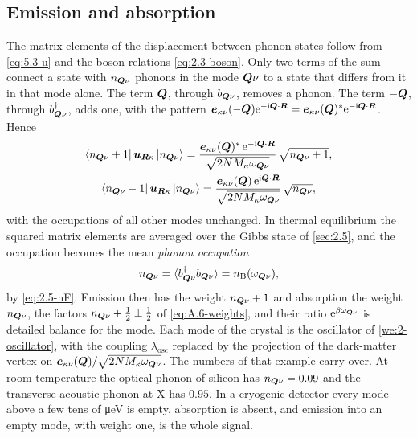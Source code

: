 \subsection{Emission and absorption}

The matrix elements of the displacement between phonon states follow from \cref{eq:5.3-u} and the boson relations \cref{eq:2.3-boson}. Only two terms of the sum connect a state with $n_{\bm{Q}\nu}$ phonons in the mode $\bm{Q}\nu$ to a state that differs from it in that mode alone. The term $\bm{Q}$, through $b_{\bm{Q}\nu}$, removes a phonon. The term $-\bm{Q}$, through $b^\dagger_{\bm{Q}\nu}$, adds one, with the pattern $\bm{e}_{\kappa\nu}(-\bm{Q})\mathrm{e}^{-\mathrm{i}\bm{Q}\cdot\bm{R}} = \bm{e}_{\kappa\nu}(\bm{Q})^*\mathrm{e}^{-\mathrm{i}\bm{Q}\cdot\bm{R}}$. Hence
\begin{equation}
  \begin{gathered}
  \langle n_{\bm{Q}\nu} + 1|\,\bm{u}_{\bm{R}\kappa}\,|n_{\bm{Q}\nu}\rangle = \frac{\bm{e}_{\kappa\nu}(\bm{Q})^*\,\mathrm{e}^{-\mathrm{i}\bm{Q}\cdot\bm{R}}}{\sqrt{2NM_\kappa\omega_{\bm{Q}\nu}}}\,\sqrt{n_{\bm{Q}\nu} + 1} ,
  \\
  \langle n_{\bm{Q}\nu} - 1|\,\bm{u}_{\bm{R}\kappa}\,|n_{\bm{Q}\nu}\rangle = \frac{\bm{e}_{\kappa\nu}(\bm{Q})\,\mathrm{e}^{\mathrm{i}\bm{Q}\cdot\bm{R}}}{\sqrt{2NM_\kappa\omega_{\bm{Q}\nu}}}\,\sqrt{n_{\bm{Q}\nu}} ,
  \end{gathered}
  \label{eq:5.3-me}
\end{equation}
with the occupations of all other modes unchanged. In thermal equilibrium the squared matrix elements are averaged over the Gibbs state of \cref{sec:2.5}, and the occupation becomes the mean \emph{phonon occupation}
\begin{equation*}
  n_{\bm{Q}\nu} = \langle b^\dagger_{\bm{Q}\nu}b_{\bm{Q}\nu}\rangle = n_{\mathrm{B}}(\omega_{\bm{Q}\nu}) ,
\end{equation*}
by \cref{eq:2.5-nF}. Emission then has the weight $n_{\bm{Q}\nu} + 1$ and absorption the weight $n_{\bm{Q}\nu}$, the factors $n_{\bm{Q}\nu} + \tfrac12 \pm \tfrac12$ of \cref{eq:A.6-weights}, and their ratio $\mathrm{e}^{\beta\omega_{\bm{Q}\nu}}$ is detailed balance for the mode. Each mode of the crystal is the oscillator of \cref{we:2-oscillator}, with the coupling $\lambda_{\mathrm{osc}}$ replaced by the projection of the dark-matter vertex on $\bm{e}_{\kappa\nu}(\bm{Q})/\sqrt{2NM_\kappa\omega_{\bm{Q}\nu}}$. The numbers of that example carry over. At room temperature the optical phonon of silicon has $n_{\bm{Q}\nu} = 0.09$ and the transverse acoustic phonon at X has $0.95$. In a cryogenic detector every mode above a few tens of \si{\micro eV} is empty, absorption is absent, and emission into an empty mode, with weight one, is the whole signal.

